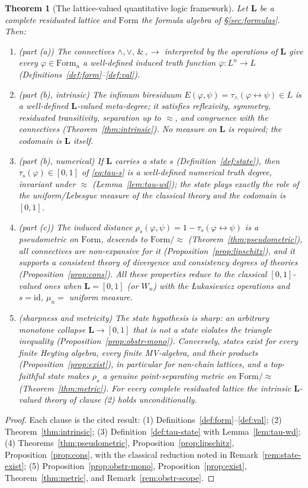 \documentclass{amsart}
\theoremstyle{definition}
\theoremstyle{plain}
\newtheorem{theorem}{Theorem}
\newcommand{\bL}{\mathbf{L}}
\newcommand{\Form}{\mathrm{Form}}
\newcommand{\fto}{\rightarrow}
\newcommand{\fbi}{\leftrightarrow}
\newcommand{\odotop}{\,\&\,}
\begin{document}
\begin{theorem}[The lattice-valued quantitative logic framework]\label{thm:main}
Let $\bL$ be a complete residuated lattice and $\Form$ the formula algebra of
\S\ref{sec:formulas}.  Then:
\begin{enumerate}
\item\emph{(part (a))} The connectives $\wedge,\vee,\odotop,\fto$ interpreted by
the operations of $\bL$ give every $\varphi\in\Form_n$ a well-defined induced
truth function $\overline\varphi:L^n\to L$
(Definitions~\ref{def:form}--\ref{def:val}).
\item\emph{(part (b), intrinsic)} The infimum biresiduum
$E(\varphi,\psi)=\tau_\wedge(\varphi\fbi\psi)\in L$ is a well-defined
$\bL$-valued meta-degree; it satisfies reflexivity, symmetry, residuated
transitivity, separation up to $\approx$, and congruence with the connectives
(Theorem~\ref{thm:intrinsic}).  No measure on $\bL$ is required; the codomain is
$\bL$ itself.
\item\emph{(part (b), numerical)} If $\bL$ carries a state $s$
(Definition~\ref{def:state}), then $\tau_s(\varphi)\in[0,1]$ of
\eqref{eq:tau-s} is a well-defined numerical truth degree, invariant under
$\approx$ (Lemma~\ref{lem:tau-wd}); the state plays exactly the role of the
uniform/Lebesgue measure of the classical theory and the codomain is $[0,1]$.
\item\emph{(part (c))} The induced distance $\rho_s(\varphi,\psi)=1-\tau_s(\varphi\fbi\psi)$
is a pseudometric on $\Form$, descends to $\Form/{\approx}$
(Theorem~\ref{thm:pseudometric}), all connectives are non-expansive for it
(Proposition~\ref{prop:lipschitz}), and it supports a consistent theory of
divergence and consistency degrees of theories
(Proposition~\ref{prop:cons}).  All these properties reduce to the classical
$[0,1]$-valued ones when $\bL=[0,1]$ (or $W_n$) with the \L ukasiewicz operations
and $s=\mathrm{id}$, $\mu_n=$ uniform measure.
\item\emph{(sharpness and metricity)} The state hypothesis is sharp: an
arbitrary monotone collapse $\bL\to[0,1]$ that is not a state violates the
triangle inequality (Proposition~\ref{prop:obstr-mono}).  Conversely, states
exist for every finite Heyting algebra, every finite MV-algebra, and their
products (Proposition~\ref{prop:exist}), in particular for non-chain lattices, and
a top-faithful state makes $\rho_s$ a genuine point-separating metric on
$\Form/{\approx}$ (Theorem~\ref{thm:metric}).  For every complete residuated
lattice the intrinsic $\bL$-valued theory of clause (2) holds unconditionally.
\end{enumerate}
\end{theorem}

\begin{proof}
Each clause is the cited result: (1) Definitions~\ref{def:form}--\ref{def:val};
(2) Theorem~\ref{thm:intrinsic}; (3) Definition~\ref{def:tau-state} with
Lemma~\ref{lem:tau-wd}; (4) Theorems~\ref{thm:pseudometric},
Proposition~\ref{prop:lipschitz}, Proposition~\ref{prop:cons}, with the classical
reduction noted in Remark~\ref{rem:state-exist}; (5)
Proposition~\ref{prop:obstr-mono}, Proposition~\ref{prop:exist},
Theorem~\ref{thm:metric}, and Remark~\ref{rem:obstr-scope}.
\end{proof}
\end{document}
